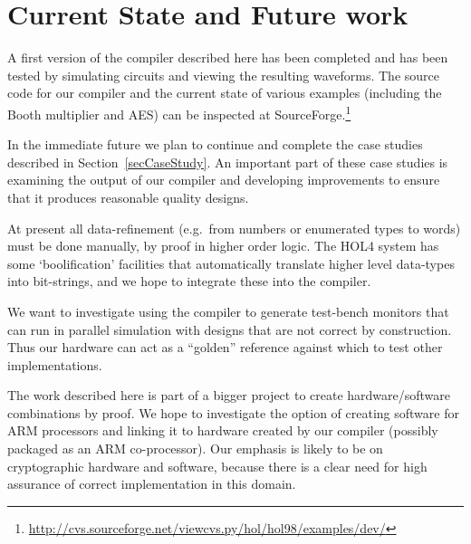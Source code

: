 \documentclass{llncs}
\begin{document}
\section{Current State and Future work}
\label{secFutureWork}


A first version of the compiler described here has been completed and
has been tested by simulating circuits and viewing the resulting
waveforms. The source code for our compiler and the current state of
various examples (including the Booth multiplier and AES) can be
inspected at
SourceForge.\footnote{\url{http://cvs.sourceforge.net/viewcvs.py/hol/hol98/examples/dev/}}


In the immediate future we plan to continue and complete the case
studies described in Section~\ref{secCaseStudy}. An important part of
these case studies is examining the output of our compiler and
developing improvements to ensure that it produces reasonable quality
designs.

At present all data-refinement (e.g.~from numbers or enumerated types
to words) must be done manually, by proof in higher order logic. The
HOL4 system has some `boolification' facilities that automatically
translate higher level data-types into bit-strings, and we hope to
integrate these into the compiler.

We want to investigate using the compiler to generate test-bench
monitors that can run in parallel simulation with designs that are not
correct by construction.  Thus our hardware can act as a ``golden''
reference against which to test other implementations.

The work described here is part of a bigger project to create
hardware/software combinations by proof.  We hope to investigate the
option of creating software for ARM processors and linking it to
hardware created by our compiler (possibly packaged as an ARM
co-processor). Our emphasis is likely to be on cryptographic hardware
and software, because there is a clear need for high assurance of
correct implementation in this domain.







\newpage
\end{document}
